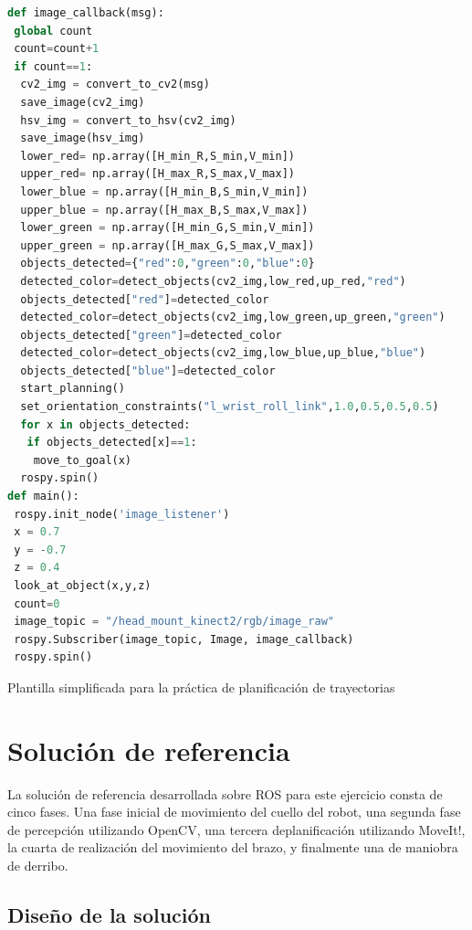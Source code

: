 \documentclass[12pt,spanish,chapterprefix, numbers=noenddot]{book}
\numberwithin{equation}{section}
\numberwithin{figure}{section}
\begin{document}
\begin{algorithm}[htb!]
	\begin{lstlisting}[breaklines=true,language=python]    
def image_callback(msg):
 global count
 count=count+1
 if count==1:
  cv2_img = convert_to_cv2(msg)
  save_image(cv2_img)
  hsv_img = convert_to_hsv(cv2_img)
  save_image(hsv_img)
  lower_red= np.array([H_min_R,S_min,V_min])
  upper_red= np.array([H_max_R,S_max,V_max])
  lower_blue = np.array([H_min_B,S_min,V_min])
  upper_blue = np.array([H_max_B,S_max,V_max])
  lower_green = np.array([H_min_G,S_min,V_min])
  upper_green = np.array([H_max_G,S_max,V_max])
  objects_detected={"red":0,"green":0,"blue":0}
  detected_color=detect_objects(cv2_img,low_red,up_red,"red")
  objects_detected["red"]=detected_color
  detected_color=detect_objects(cv2_img,low_green,up_green,"green")
  objects_detected["green"]=detected_color
  detected_color=detect_objects(cv2_img,low_blue,up_blue,"blue")
  objects_detected["blue"]=detected_color
  start_planning()
  set_orientation_constraints("l_wrist_roll_link",1.0,0.5,0.5,0.5)
  for x in objects_detected:
   if objects_detected[x]==1:
    move_to_goal(x)
  rospy.spin()
def main():
 rospy.init_node('image_listener')
 x = 0.7
 y = -0.7
 z = 0.4
 look_at_object(x,y,z)
 count=0
 image_topic = "/head_mount_kinect2/rgb/image_raw"
 rospy.Subscriber(image_topic, Image, image_callback)
 rospy.spin()
	\end{lstlisting}
\caption{\label{alg:template-py}Plantilla simplificada para la práctica de planificación de trayectorias}
\end{algorithm}

\chapter{Solución de referencia}\label{sec:solución}
La solución de referencia desarrollada sobre ROS para este ejercicio consta de cinco fases. Una fase inicial de movimiento del cuello del robot, una segunda fase de percepción utilizando OpenCV, una tercera deplanificación utilizando MoveIt!, la cuarta de realización del movimiento del brazo, y finalmente una de maniobra de derribo. 

\section{Diseño de la solución}
\end{document}
